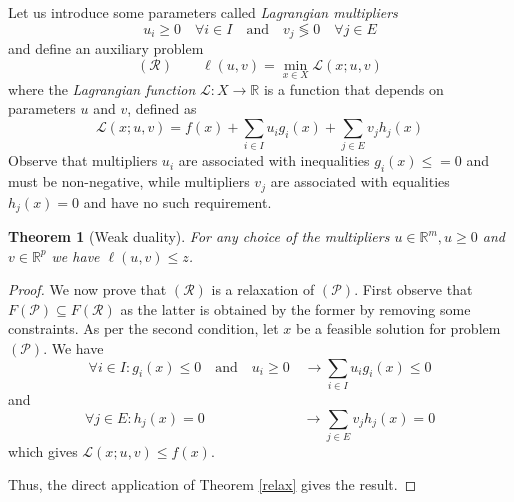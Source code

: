 \documentclass{book}
\newcommand{\R}{\mathbb{R}}
\theoremstyle{theoremv2}
\newtheorem{theorem}{Theorem}[chapter]
\theoremstyle{defv2}
\theoremstyle{remark}
\theoremstyle{remark}
\begin{document}
Let us introduce some parameters called \emph{Lagrangian multipliers}
\[
    u_i\geq 0 \quad \forall i\in I \quad \text{and} \quad v_j \lessgtr 0 \quad \forall j \in E
\]
and define an auxiliary problem 
\[
    (\mathcal{R}) \qquad \ell (u,v)=\min_{x\in X}\mathcal{L}(x;u,v)
\]
where the \emph{Lagrangian function} $\mathcal{L}:X\to\R$ is a function that depends on parameters $u$ and $v$, defined as 
\[
    \mathcal{L}(x;u,v) = f(x) + \displaystyle\sum_{i\in I} u_i g_i(x) + \displaystyle\sum_{j\in E}v_jh_j(x)
\]
Observe that multipliers $u_i$ are associated with inequalities $g_i(x)\leq =0$ and must be non-negative, while multipliers $v_j$ are associated with equalities $h_j(x)=0$ and have no such requirement.
\begin{theorem}[Weak duality]
    \label{Wdual}
    For any choice of the multipliers $u\in\R^m,u\geq 0$ and $v\in\R^p$ we have $\ell(u,v)\leq z$.
\end{theorem}
\begin{proof}
    We now prove that $(\mathcal{R})$ is a relaxation of $(\mathcal{P})$. First observe that $F(\mathcal{P})\subseteq F(\mathcal{R})$ as the latter is obtained by the former by removing some constraints. As per the second condition, let $x$ be a feasible solution for problem $(\mathcal{P})$. We have 
    \[
        \forall i \in I : g_i(x) \leq 0 \quad \text{and} \quad u_i \geq 0 \quad \to \displaystyle\sum_{i\in I} u_i g_i(x) \leq 0
    \]
    and 
    \[
        \forall j \in E : h_j(x) = 0 \qquad \qquad \qquad \quad \to \displaystyle\sum_{j\in E} v_j h_j(x) = 0
    \]
    which gives $\mathcal{L}(x;u,v)\leq f(x)$.

    Thus, the direct application of Theorem \ref{relax} gives the result.
\end{proof}
\end{document}
